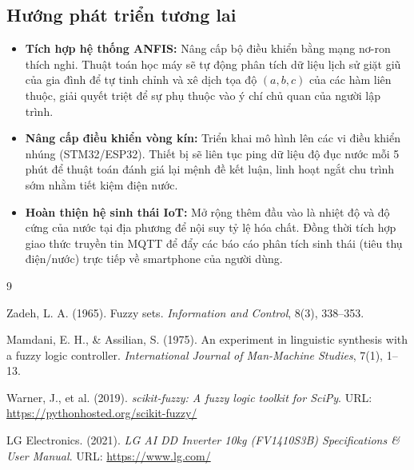 \documentclass[12pt, a4paper]{article}
\begin{document}
\subsection{Hướng phát triển tương lai}
\begin{itemize}
    \item \textbf{Tích hợp hệ thống ANFIS:} Nâng cấp bộ điều khiển bằng mạng nơ-ron thích nghi. Thuật toán học máy sẽ tự động phân tích dữ liệu lịch sử giặt giũ của gia đình để tự tinh chỉnh và xê dịch tọa độ $(a, b, c)$ của các hàm liên thuộc, giải quyết triệt để sự phụ thuộc vào ý chí chủ quan của người lập trình.
    \item \textbf{Nâng cấp điều khiển vòng kín:} Triển khai mô hình lên các vi điều khiển nhúng (STM32/ESP32). Thiết bị sẽ liên tục ping dữ liệu độ đục nước mỗi 5 phút để thuật toán đánh giá lại mệnh đề kết luận, linh hoạt ngắt chu trình sớm nhằm tiết kiệm điện nước.
    \item \textbf{Hoàn thiện hệ sinh thái IoT:} Mở rộng thêm đầu vào là nhiệt độ và độ cứng của nước tại địa phương để nội suy tỷ lệ hóa chất. Đồng thời tích hợp giao thức truyền tin MQTT để đẩy các báo cáo phân tích sinh thái (tiêu thụ điện/nước) trực tiếp về smartphone của người dùng.
\end{itemize}

\newpage
\renewcommand{\refname}{Tài liệu tham khảo}
\begin{thebibliography}{9}

Zadeh, L. A. (1965). Fuzzy sets. \textit{Information and Control}, 8(3), 338–353.

Mamdani, E. H., \& Assilian, S. (1975). An experiment in linguistic synthesis with a fuzzy logic controller. \textit{International Journal of Man-Machine Studies}, 7(1), 1–13.

Warner, J., et al. (2019). \textit{scikit-fuzzy: A fuzzy logic toolkit for SciPy}. URL: \url{https://pythonhosted.org/scikit-fuzzy/}

LG Electronics. (2021). \textit{LG AI DD Inverter 10kg (FV1410S3B) Specifications \& User Manual}. URL: \url{https://www.lg.com/}

\end{thebibliography}

\newpage
\appendix
\end{document}

